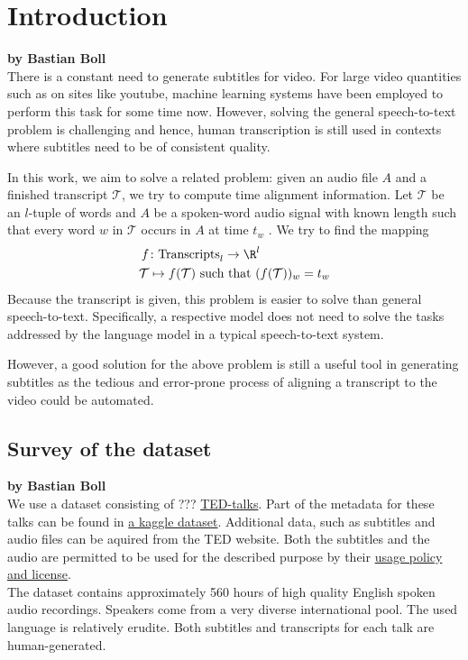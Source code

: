 \chapter{Introduction}
\label{chap:intro}

\textbf{by Bastian Boll} \\

There is a constant need to generate subtitles for video. For large video quantities such as on sites like youtube, machine learning systems have been employed to perform this task for some time now. However, solving the general speech-to-text problem is challenging and hence, human transcription is still used in contexts where subtitles need to be of consistent quality.

In this work, we aim to solve a related problem: given an audio file $A$ and a finished transcript $\mathcal{T}$, we try to compute time alignment information. Let $\mathcal{T}$ be an $l$-tuple of words and $A$ be a spoken-word audio signal with known length such that every word $w$ in $\mathcal{T}$ occurs in $A$ at time $t_w$ . We try to find the mapping
\begin{align*}
	f&\colon\textrm{Transcripts}_l\to\R^l\\
	\mathcal{T}&\mapsto f(\mathcal{T})\textrm{ such that }(f(\mathcal{T}))_w=t_w
\end{align*}
Because the transcript is given, this problem is easier to solve than general speech-to-text. Specifically, a respective model does not need to solve the tasks addressed by the language model in a typical speech-to-text system.

However, a good solution for the above problem is still a useful tool in generating subtitles as the tedious and error-prone process of aligning a transcript to the video could be automated.

\section{Survey of the dataset}

\textbf{by Bastian Boll} \\

We use a dataset consisting of ??? \href{https://www.ted.com}{TED-talks}. Part of the metadata for these talks can be found in \href{https://www.kaggle.com/rounakbanik/ted-talks}{a kaggle dataset}. Additional data, such as subtitles and audio files can be aquired from the TED website. Both the subtitles and the audio are permitted to be used for the described purpose by their \href{https://www.ted.com/about/our-organization/our-policies-terms/ted-talks-usage-policy}{usage policy and license}.\\
The dataset contains approximately 560 hours of high quality English spoken audio recordings. Speakers come from a very diverse international pool. The used language is relatively erudite. Both subtitles and transcripts for each talk are human-generated.

